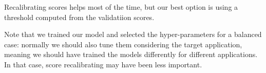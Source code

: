 \documentclass[hidelinks, 12pt, twocolumn]{article}
\begin{document}
Recalibrating scores helps most of the time, but our best option is
using a threshold computed from the validatiion scores.

Note that we trained our model and selected the hyper-parameters for a balanced case:
normally we should also tune them considering the target application,
meaning we should have trained the models differently for different applications.
In that case, score recalibrating may have been less important.
\end{document}
